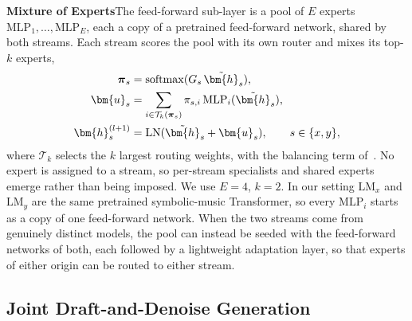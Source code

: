 \textbf{Mixture of Experts}\quad The feed-forward sub-layer is a pool of
$E$ experts $\mathrm{MLP}_1,\ldots,\mathrm{MLP}_E$, each a copy of a
pretrained feed-forward network, shared by both streams. Each stream
scores the pool with its own router and mixes its top-$k$ experts,
\begin{align}
    \boldsymbol{\pi}_s
    &= \operatorname{softmax}(G_s\,\tilde{\bm{h}}_s),
    \notag \\
    \bm{u}_s
    &= \sum_{i\in\mathcal{T}_k(\boldsymbol{\pi}_s)}
       \pi_{s,i}\,\mathrm{MLP}_i(\tilde{\bm{h}}_s),
    \notag \\
    \bm{h}^{(l+1)}_s
    &= \mathrm{LN}(\tilde{\bm{h}}_s + \bm{u}_s),
    \qquad s\in\{x,y\},
    \label{eq:moe}
\end{align}
where $\mathcal{T}_k$ selects the $k$ largest routing weights, with the
balancing term of~\cite{fedus2022switch}. No expert is assigned to a
stream, so per-stream specialists and shared experts emerge rather than
being imposed. We use $E=4$, $k=2$. In our setting $\mathrm{LM}_x$ and
$\mathrm{LM}_y$ are the same pretrained symbolic-music Transformer, so
every $\mathrm{MLP}_i$ starts as a copy of one feed-forward network.
When the two streams come from genuinely distinct models, the pool can
instead be seeded with the feed-forward networks of both, each followed
by a lightweight adaptation layer, so that experts of either origin can
be routed to either stream.

\subsection{Joint Draft-and-Denoise Generation}
\label{sec:generation}

